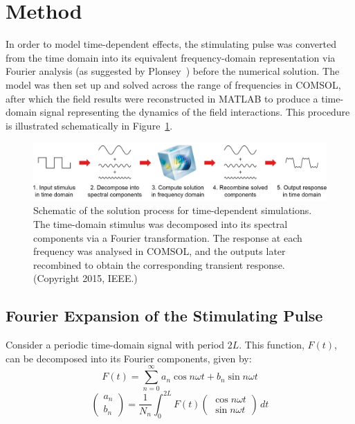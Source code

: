 \section{Method}

In order to model time-dependent effects, the stimulating pulse was converted
from the time domain into its equivalent frequency-domain representation via
Fourier analysis (as suggested by Plonsey~\cite{plonsey1967}) before the
numerical solution. The model was then set up and solved across the range of
frequencies in COMSOL, after which the field results were reconstructed in
MATLAB to produce a time-domain signal representing the dynamics of the field
interactions. This procedure is illustrated schematically in
Figure~\ref{fig:td_method_summary}.

\begin{figure}
	\centering
	\includegraphics[width=\textwidth]{Simulations/TimeDep/method_summary}
	\caption[Schematic of the solution process for time-dependent
	simulations]{Schematic of the solution process for time-dependent simulations.
	The time-domain stimulus was decomposed into its spectral components via a
	Fourier transformation. The response at each frequency was analysed in COMSOL,
	and the outputs later recombined to obtain the corresponding transient
	response. (Copyright \textcopyright{} 2015, IEEE.)}
	\label{fig:td_method_summary}
\end{figure}

\subsection{Fourier Expansion of the Stimulating Pulse}

Consider a periodic time-domain signal with period $ 2L $. This function, $ F(t)
$, can be decomposed into its Fourier components, given by:
\begin{equation}
	F(t) = \sum_{n=0}^\infty a_n \cos n \omega t + b_n \sin n \omega t
	\label{eqn:fourier_general}
\end{equation}
\renewcommand{\arraystretch}{0.9}
\begin{equation}
	\begin{pmatrix} a_n \\ b_n \end{pmatrix} = \frac{1}{N_n} \int_0^{2L} F(t)
	\begin{pmatrix} \cos n \omega t \\ \sin n \omega t \end{pmatrix} \, dt
	\label{eqn:fourier_coefficients_general}
\end{equation}

